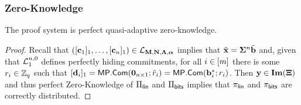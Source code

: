 \subsubsection{Zero-Knowledge}

\begin{theorem}
The proof system is perfect quasi-adaptive zero-knowledge.
\end{theorem}

\begin{proof}
Recall that $([\mathbf{c}_1]_1,\ldots,[\mathbf{c}_n]_1)\in\mathcal{L}_{\mathbf{{M}},\mathbf{{N}},\mathbf{{\Lambda}},{\boldsymbol \alpha}}$ implies that
$
{\tilde{\mathbf{x}}}
=\mathbf{{\Sigma}}^n{\tilde{\mathbf{b}}}
$
and, given that $\mathcal{L}_1^{n,0}$ defines perfectly hiding commitments, for all $i\in[{m}]$ there is some $r_i\in\mathbb{Z}_q$ such that
$[\mathbf{d}_i]_1=\mathsf{MP}.\mathsf{Com}(\mathbf{{0}}_{n\times1};\tilde{{r}}_i)=\mathsf{MP}.\mathsf{Com}(\mathbf{b}_i^*;r_i)$. Then $\mathbf{y}\in\mathbf{Im}(\mathbf{{\Xi}})$ and thus perfect Zero-Knowledge of $\Pi_{\mathsf{lin}}$ and $\Pi_{\mathsf{bits}}$ implies that $\pi_{\mathsf{lin}}$ and $\pi_{\mathsf{bits}}$ are correctly distributed.
\end{proof}
